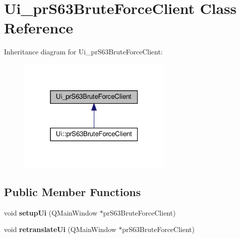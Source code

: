 \hypertarget{class_ui__pr_s63_brute_force_client}{}\section{Ui\+\_\+pr\+S63\+Brute\+Force\+Client Class Reference}
\label{class_ui__pr_s63_brute_force_client}


Inheritance diagram for Ui\+\_\+pr\+S63\+Brute\+Force\+Client\+:
\nopagebreak
\begin{figure}[H]
\begin{center}
\leavevmode
\includegraphics[width=211pt]{class_ui__pr_s63_brute_force_client__inherit__graph}
\end{center}
\end{figure}
\subsection*{Public Member Functions}
\begin{DoxyCompactItemize}
\item 
\mbox{\label{class_ui__pr_s63_brute_force_client_a7641b55c239f50f1f7b81018814024bb}} 
void {\bfseries setup\+Ui} (Q\+Main\+Window $\ast$pr\+S63\+Brute\+Force\+Client)
\item 
\mbox{\label{class_ui__pr_s63_brute_force_client_a11e7f53ff6515d09633bd92d1153f374}} 
void {\bfseries retranslate\+Ui} (Q\+Main\+Window $\ast$pr\+S63\+Brute\+Force\+Client)
\end{DoxyCompactItemize}
